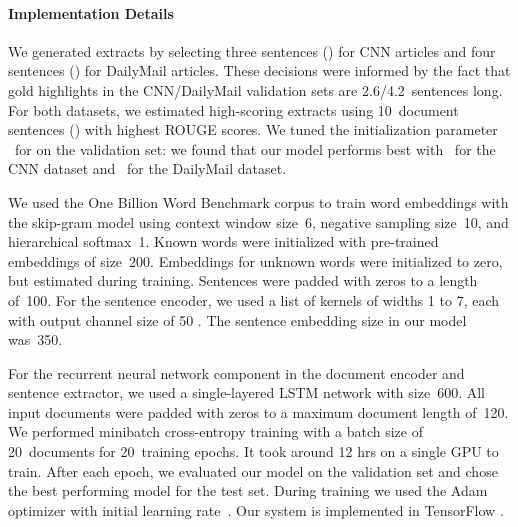 \documentclass[11pt,a4paper]{article}
\begin{document}
\paragraph{Implementation Details}

We generated extracts by selecting three sentences () for CNN
articles and four sentences () for DailyMail articles. These
decisions were informed by the fact that gold highlights in the
CNN/DailyMail validation sets are 2.6/4.2~sentences long.  For both
datasets, we estimated high-scoring extracts using 10~document
sentences () with highest ROUGE scores. We tuned the
initialization parameter ~for  on the validation
set: we found that our model performs best with ~for the CNN
dataset and ~for the DailyMail dataset.

We used the One Billion Word Benchmark corpus \cite{billionbenchmark}
to train word embeddings with the skip-gram model \cite{word2vec}
using context window size~6, negative sampling size~10, and
hierarchical softmax~1.  Known words were initialized with pre-trained
embeddings of size~200. Embeddings for unknown words were initialized
to zero, but estimated during training. Sentences were padded with
zeros to a length of~100. For the sentence encoder, we used a list of
kernels of widths 1 to 7, each with output channel size of 50
\cite{kim-aaai16}. The sentence embedding size in our model was~350.

For the recurrent neural network component in the document encoder and
sentence extractor, we used a single-layered LSTM network with
size~600. All input documents were padded with zeros to a maximum
document length of~120. We performed minibatch cross-entropy training
with a batch size of 20~documents for 20~training epochs. It took
around 12 hrs on a single GPU to train. After each epoch, we evaluated
our model on the validation set and chose the best performing model
for the test set. During training we used the Adam optimizer
\cite{adam-14} with initial learning rate~. Our system is
implemented in TensorFlow \cite{tensorflow2015-whitepaper}.
\end{document}
